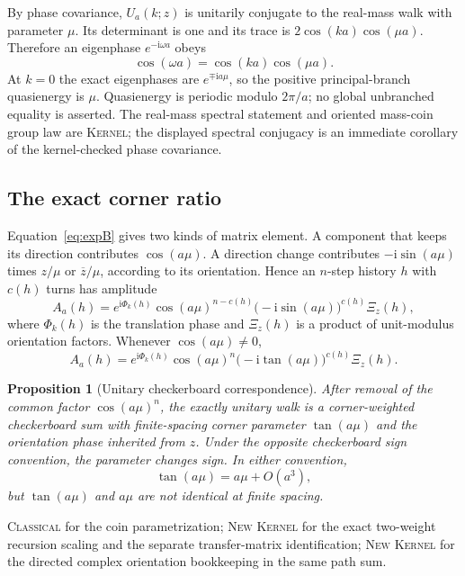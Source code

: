 \documentclass[11pt]{article}
\newcommand{\Kernel}{\textcolor{kernelcolor}{\textsc{Kernel}}}
\newcommand{\Classical}{\textcolor{classicalcolor}{\textsc{Classical}}}
\newcommand{\NewResult}{\textsc{New}}
\newcommand{\ii}{\mathrm{i}}
\newtheorem{proposition}[theorem]{Proposition}
\begin{document}
By phase covariance, $U_a(k;z)$ is unitarily conjugate to the real-mass walk
with parameter $\mu$.  Its determinant is one and its trace is
$2\cos(ka)\cos(\mu a)$.  Therefore an eigenphase $e^{-\ii\omega a}$ obeys
\begin{equation}\label{eq:dispersion}
 \boxed{\cos(\omega a)=\cos(ka)\cos(\mu a)}.
\end{equation}
At $k=0$ the exact eigenphases are $e^{\mp\ii a\mu}$, so the positive
principal-branch quasienergy is $\mu$.  Quasienergy is periodic modulo
$2\pi/a$; no global unbranched equality is asserted.  The real-mass spectral
statement and oriented mass-coin group law are \Kernel{}; the displayed
spectral conjugacy is an immediate corollary of the kernel-checked phase
covariance.

\subsection{The exact corner ratio}

Equation~\eqref{eq:expB} gives two kinds of matrix element.  A component that
keeps its direction contributes $\cos(a\mu)$.  A direction change contributes
$-\ii\sin(a\mu)$ times $z/\mu$ or $\overline z/\mu$, according to its
orientation.  Hence an $n$-step history $h$ with $c(h)$ turns has amplitude
\begin{equation}\label{eq:pathweight}
 A_a(h)
 =e^{\ii\Phi_k(h)}
   \cos(a\mu)^{n-c(h)}
   \bigl(-\ii\sin(a\mu)\bigr)^{c(h)}
   \Xi_z(h),
\end{equation}
where $\Phi_k(h)$ is the translation phase and $\Xi_z(h)$ is a product of
unit-modulus orientation factors.  Whenever $\cos(a\mu)\neq0$,
\begin{equation}\label{eq:tanweight}
 A_a(h)
 =e^{\ii\Phi_k(h)}\cos(a\mu)^n
   \bigl(-\ii\tan(a\mu)\bigr)^{c(h)}\Xi_z(h).
\end{equation}

\begin{proposition}[Unitary checkerboard correspondence]\label{prop:tan}
After removal of the common factor $\cos(a\mu)^n$, the exactly unitary walk is
a corner-weighted checkerboard sum with finite-spacing corner parameter
$\tan(a\mu)$ and the orientation phase inherited from $z$.  Under the opposite
checkerboard sign convention, the parameter changes sign.  In either
convention,
\begin{equation}
 \tan(a\mu)=a\mu+O(a^3),
\end{equation}
but $\tan(a\mu)$ and $a\mu$ are not identical at finite spacing.
\end{proposition}
\noindent\Classical{} for the coin parametrization; \NewResult{} \Kernel{} for
the exact two-weight recursion scaling and the separate transfer-matrix
identification; \NewResult{} \Kernel{} for the directed complex orientation
bookkeeping in the same path sum.
\end{document}
